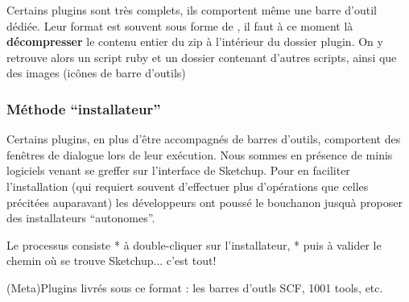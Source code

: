 \documentclass[a4paper,12pt,french]{sphinxmanual}
\begin{document}
Certains plugins sont très complets, ils comportent même une barre d'outil dédiée. Leur format est souvent sous forme de , il faut à ce moment là \textbf{décompresser} le contenu entier du zip à l'intérieur du dossier plugin. On y retrouve alors un script ruby et un dossier contenant d'autres scripts, ainsi que des images (icônes de barre d'outils)


\subsubsection{Méthode ``installateur''}
\label{su/install-plugin-su:methode-installateur}
Certains plugins, en plus d'être accompagnés de barres d'outils, comportent des fenêtres de dialogue lors de leur exécution. Nous sommes en présence de minis logiciels venant se greffer sur l'interface de Sketchup. Pour en faciliter l'installation (qui requiert souvent d'effectuer plus d'opérations que celles précitées auparavant) les développeurs ont poussé le bouchanon jusquà proposer des installateurs ``autonomes''.

Le processus consiste
* à double-cliquer sur l'installateur,
* puis à  valider le chemin où se trouve Sketchup... c'est tout!

(Meta)Plugins livrés sous ce format : les barres d'outls SCF, 1001 tools, etc.
\end{document}
